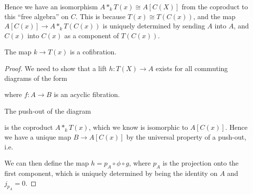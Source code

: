 Hence we have an isomorphism $A\ast_k T(x) \cong A[C(X)]$ from the coproduct to this ``free algebra'' on $C$. This is because $T(x)\cong T(C(x))$, and the map $A[C(x)]\longrightarrow A\ast_k T(C(x))$ is uniquely determined by sending $A$ into $A$, and $C(x)$ into $C(x)$ as a component of $T(C(x))$. 


\begin{lemma}
The map $k\longrightarrow T(x)$ is a cofibration. 
\end{lemma}
\begin{proof}
We need to show that a lift $h:T(X)\longrightarrow A$ exists for all commuting diagrams of the form
\begin{center}
\end{center}
where $f\colon A\longrightarrow B$ is an acyclic fibration. 
    
The push-out of the diagram 
\begin{center}
\end{center}
is the coproduct $A\ast_k T(x)$, which we know is isomorphic to $A[C(x)]$. Hence we have a unique map $B\longrightarrow A[C(x)]$ by the universal property of a push-out, i.e. 
\begin{center}
\end{center}
We can then define the map $h = p_A \circ \phi \circ g$, where $p_A$ is the projection onto the first component, which is uniquely determined by being the identity on $A$ and $j_{p_A} = 0$. 
    

\end{proof}

